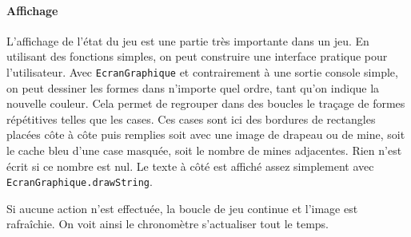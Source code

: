 \documentclass[a4paper, 12pt, oneside]{article}
\newcommand{\var}[1]{\texttt{#1}}
\begin{document}
\paragraph{Affichage} L'affichage de l'état du jeu est une partie très importante dans un jeu. En utilisant des fonctions simples, on peut construire une interface pratique pour l'utilisateur. Avec \var{EcranGraphique} et contrairement à une sortie console simple, on peut dessiner les formes dans n'importe quel ordre, tant qu'on indique la nouvelle couleur. Cela permet de regrouper dans des boucles le traçage de formes répétitives telles que les cases. Ces cases sont ici des bordures de rectangles placées côte à côte puis remplies soit avec une image de drapeau ou de mine, soit le cache bleu d'une case masquée, soit le nombre de mines adjacentes. Rien n'est écrit si ce nombre est nul. Le texte à côté est affiché assez simplement avec \var{EcranGraphique.drawString}.

Si aucune action n'est effectuée, la boucle de jeu continue et l'image est rafraîchie. On voit ainsi le chronomètre s'actualiser tout le temps.
\end{document}
